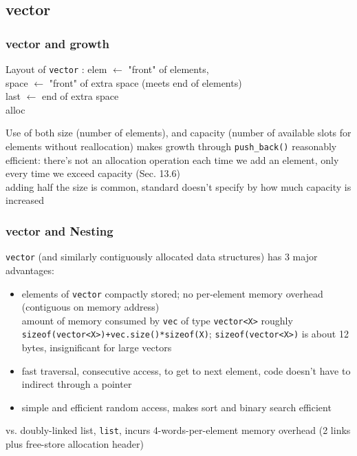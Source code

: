 \documentclass[10pt]{amsart}
\begin{document}
\begin{multicols*}{2}
\subsection{vector}

\subsubsection{vector and growth}

Layout of \verb|vector| : elem $\leftarrow$ "front" of elements, \\
space $\leftarrow$ "front" of extra space (meets end of elements) \\
last $\leftarrow$ end of extra space \\
alloc

Use of both size (number of elements), and capacity (number of available slots for elements without reallocation) makes growth through \verb|push_back()| reasonably efficient: there's not an allocation operation each time we add an element, only every time we exceed capacity (Sec. 13.6) \\
adding half the size is common, standard doesn't specify by how much capacity is increased

\subsubsection{vector and Nesting}

\verb|vector| (and similarly contiguously allocated data structures) has 3 major advantages:
\begin{itemize}
	\item elements of \verb|vector| compactly stored; no per-element memory overhead (contiguous on memory address) \\
	amount of memory consumed by \verb|vec| of type \verb|vector<X>| roughly \\
	\verb|sizeof(vector<X>)+vec.size()*sizeof(X)|; \verb|sizeof(vector<X>)| is about 12 bytes, insignificant for large vectors
	\item fast traversal, consecutive access, to get to next element, code doesn't have to indirect through a pointer 
	\item simple and efficient random access, makes sort and binary search efficient
\end{itemize}

vs. doubly-linked list, \verb|list|, incurs 4-words-per-element memory overhead (2 links plus free-store allocation header)


\end{multicols*}
\end{document}
